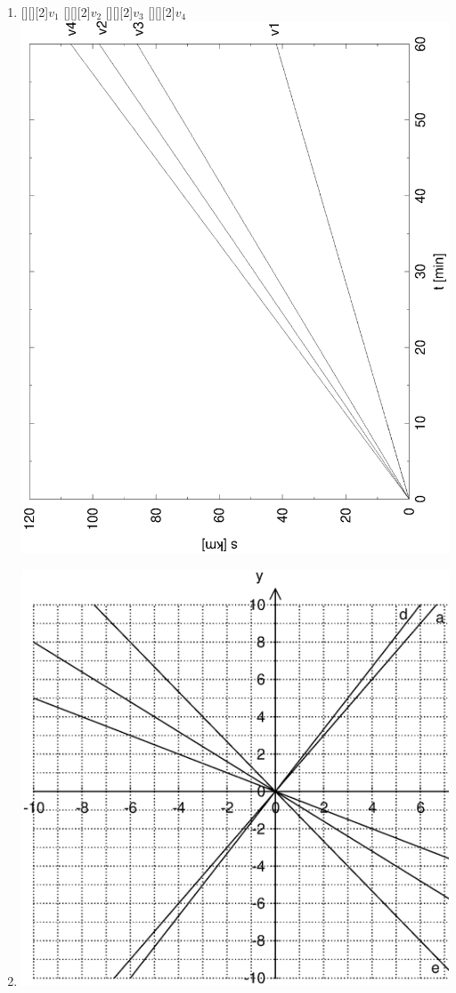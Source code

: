 \documentclass[%
11pt,%
twoside,%
titlepage,%
german,%
headsepline%
]{scrartcl}
\begin{document}
{{\begin{enumerate}
\item
\begin{center}
[][][2]{$v_1$} [][][2]{$v_2$} [][][2]{$v_3$} [][][2]{$v_4$}
\includegraphics[angle=-90,width=\linewidth]{pictures/vierzug.eps}
\end{center}

\item \mbox{}\vspace*{-\baselineskip}
\begin{center}
\includegraphics[width=0.9\linewidth]{pictures/geraden1.eps}
\end{center}


\end{enumerate}}}
\end{document}
